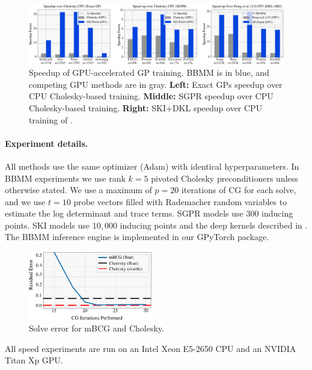 \begin{figure}[t]
  \centering
  \includegraphics[width=\textwidth]{figures/sparse_gp_results}
  \caption[Speedup of GPU-accelerated GP training.]{
    Speedup of GPU-accelerated GP training.
    BBMM is in blue, and competing GPU methods are in gray.
    {\bf Left:} Exact GPs speedup over CPU Cholesky-based training.
    {\bf Middle:} SGPR \cite{titsias2009variational,hensman2013gaussian} speedup over CPU Cholesky-based training.
    {\bf Right:} SKI+DKL \cite{wilson2015kernel,wilson2016deep} speedup over CPU training of \citet{dong2017scalable}.
    \label{fig:timing_results}
  }
\end{figure}

\paragraph{Experiment details.} All methods use the same optimizer (Adam) with identical hyperparameters.
In BBMM experiments we use rank $k\!=\!5$ pivoted Cholesky preconditioners unless otherwise stated.
We use a maximum of $p\!=\!20$ iterations of CG for each solve, and
we use $t\!=\!10$ probe vectors filled with Rademacher random variables to estimate the log determinant and trace terms.
SGPR models use $300$ inducing points.
SKI models use $10,\!000$ inducing points and  the deep kernels described in \cite{wilson2016deep}.
The BBMM inference engine is implemented in our GPyTorch package.
\begin{figure}[t!]
  \begin{center}
    \includegraphics[width=0.48\textwidth]{figures/cg_error}
  \end{center}
  \caption{Solve error for mBCG and Cholesky. \label{fig:cg_error}}
\end{figure}
All speed experiments are run on an Intel Xeon E5-2650 CPU and an NVIDIA Titan Xp GPU.

